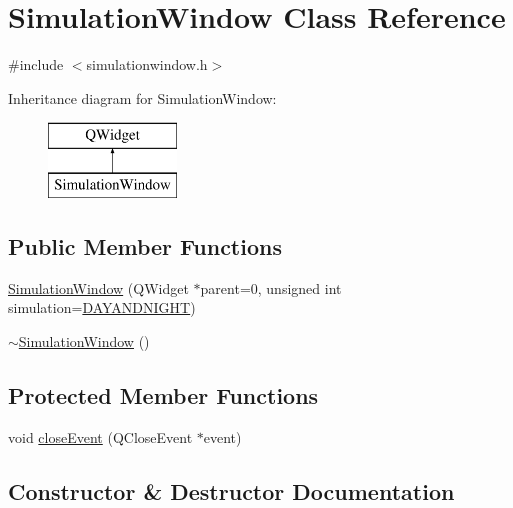 \hypertarget{class_simulation_window}{}\section{Simulation\+Window Class Reference}
\label{class_simulation_window}


{\ttfamily \#include $<$simulationwindow.\+h$>$}

Inheritance diagram for Simulation\+Window\+:\begin{figure}[H]
\begin{center}
\leavevmode
\includegraphics[height=2.000000cm]{class_simulation_window}
\end{center}
\end{figure}
\subsection*{Public Member Functions}
\begin{DoxyCompactItemize}
\item 
\mbox{\hyperlink{class_simulation_window_a6ee14ba2710fb2021d35fc0d825bc5a5}{Simulation\+Window}} (Q\+Widget $\ast$parent=0, unsigned int simulation=\mbox{\hyperlink{simulationwindow_8h_a68940327886ee3a66887ae14300edd04}{D\+A\+Y\+A\+N\+D\+N\+I\+G\+HT}})
\item 
\mbox{\hyperlink{class_simulation_window_a1bad20391bd8ee4c2366bd1ac667ecdf}{$\sim$\+Simulation\+Window}} ()
\end{DoxyCompactItemize}
\subsection*{Protected Member Functions}
\begin{DoxyCompactItemize}
\item 
void \mbox{\hyperlink{class_simulation_window_a1470ae0e2001269307c0e9c6972a5218}{close\+Event}} (Q\+Close\+Event $\ast$event)
\end{DoxyCompactItemize}


\subsection{Constructor \& Destructor Documentation}
\mbox{\label{class_simulation_window_a6ee14ba2710fb2021d35fc0d825bc5a5}} 
